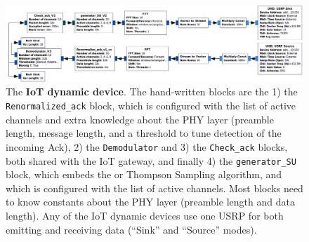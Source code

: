 \begin{figure}[!b]
	\centering
    \includegraphics[width=1.00\textwidth]{2-Chapters/4-Chapter/Images/USRP_TX_SU__v1__simple_grc.png}
    \caption[The \textbf{IoT dynamic device} flow-graph.]{The \textbf{IoT dynamic device}. The hand-written blocks are the 1) the \texttt{Renormalized\_ack} block, which is configured with the list of active channels and extra knowledge about the PHY layer (preamble length, message length, and a threshold to tune detection of the incoming Ack), 2) the \texttt{Demodulator} and 3) the \texttt{Check\_ack} blocks, both shared with the IoT gateway, and finally 4) the \texttt{generator\_SU} block, which embeds the \UCB{} or Thompson Sampling algorithm, and which is configured with the list of active channels. Most blocks need to know constants about the PHY layer (preamble length and data length). Any of the IoT dynamic devices use one USRP for both emitting and receiving data (``Sink'' and ``Source'' modes).}
    \label{fig:4app:USRP_TX_SU__v1__simple_grc}
\end{figure}